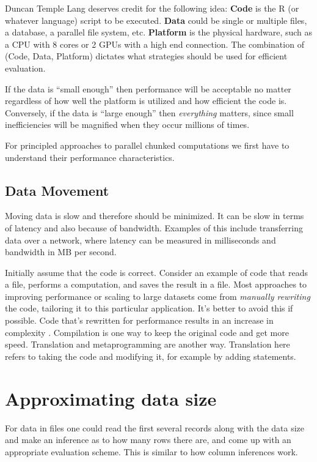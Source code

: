 \documentclass[12pt]{article}
\begin{document}
Duncan Temple Lang deserves credit for the following idea:
\textbf{Code} is the R (or whatever language) script to be executed.
\textbf{Data} could be single or multiple files, a database, a parallel
file system, etc.  \textbf{Platform} is the physical hardware, such as a
CPU with 8 cores or 2 GPUs with a high end connection. The combination of
(Code, Data, Platform) dictates what strategies should be used for
efficient evaluation.

If the data is ``small enough'' then performance will be acceptable no
matter regardless of how well the platform is utilized and how efficient
the code is. Conversely, if the data is ``large enough'' then
\emph{everything} matters, since small inefficiencies will be magnified
when they occur millions of times.

For principled approaches to parallel chunked computations we
first have to understand their performance characteristics.


\subsection{Data Movement}

Moving data is slow and therefore should be minimized. It can be slow in
terms of latency and also because of bandwidth. Examples of this include
transferring data over a network, where latency can be measured in
milliseconds and bandwidth in MB per second.

Initially assume that the code is correct. Consider an example of code that
reads a file, performs a computation, and saves the result in a file.
Most approaches to improving performance or scaling to large datasets
come from \emph{manually rewriting} the code, tailoring it to this
particular application. It's better to avoid this if possible.  Code that's
rewritten for performance results in an increase in complexity
\cite{matloff2015parallel}.  Compilation is one way to keep the original
code and get more speed. Translation and metaprogramming are another way.
Translation here refers to taking the code and modifying it, for example by
adding statements.


\section{Approximating data size}

For data in files one could read the first several records along with the
data size and make an inference as to how many rows there are, and come up
with an appropriate evaluation scheme. This is similar to how column
inferences work.
\end{document}
